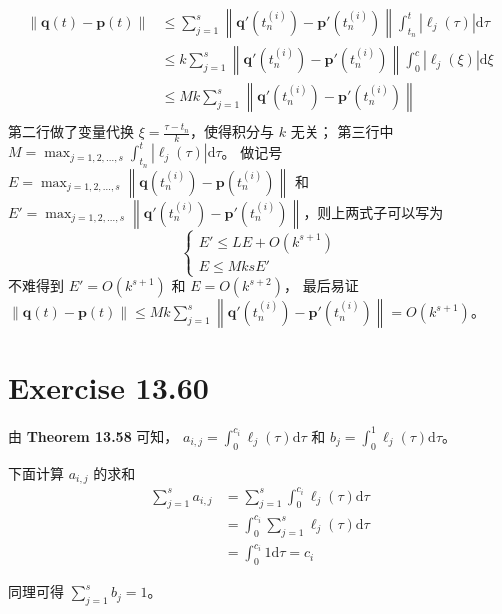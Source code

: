 \documentclass[a4paper]{article}
\begin{document}
\begin{itemize}
\begin{equation}
        \begin{aligned}
            \left\|\mathbf{q}(t) - \mathbf{p}(t)\right\|
            &\leq \sum_{j=1}^{s} \left\|
                \mathbf{q}'(t_n^{(i)}) - \mathbf{p}'(t_n^{(i)})
            \right\| \int_{t_n}^{t} |\ell_j(\tau)| \text{d}\tau\\
            &\leq k\sum_{j=1}^{s} \left\|
                \mathbf{q}'(t_n^{(i)}) - \mathbf{p}'(t_n^{(i)})
            \right\| \int_{0}^{c} |\ell_j(\xi)| \text{d}\xi\\
            &\leq Mk\sum_{j=1}^{s} \left\|
                \mathbf{q}'(t_n^{(i)}) - \mathbf{p}'(t_n^{(i)})
            \right\|\\
        \end{aligned}
    \end{equation}
    第二行做了变量代换 $\xi = \frac{\tau - t_n}{k}$，使得积分与 $k$ 无关；
    第三行中 $M = \displaystyle\max_{j=1,2,\ldots,s} \int_{t_n}^{t} |\ell_j(\tau)| \text{d}\tau$。
    做记号 $E = \displaystyle\max_{j=1,2,\ldots,s} \left\|
        \mathbf{q}(t_n^{(i)}) - \mathbf{p}(t_n^{(i)})
    \right\|$ 和 $E' = \displaystyle\max_{j=1,2,\ldots,s} \left\|
        \mathbf{q}'(t_n^{(i)}) - \mathbf{p}'(t_n^{(i)})
    \right\|$，则上两式子可以写为
    \begin{equation}
        \begin{cases}
            E' \leq L E + O(k^{s+1})\\
            E \leq Mks E'
        \end{cases}
    \end{equation}
    不难得到 $E' = O(k^{s+1})$ 和 $E = O(k^{s+2})$，
    最后易证 $\left\|\mathbf{q}(t) - \mathbf{p}(t)\right\| 
    \leq Mk\displaystyle\sum_{j=1}^{s} \left\|
        \mathbf{q}'(t_n^{(i)}) - \mathbf{p}'(t_n^{(i)})
    \right\| = O(k^{s+1})$。
\end{itemize}

\section*{Exercise 13.60}

\par 由 \textbf{Theorem 13.58} 可知，
$a_{i,j} = \displaystyle\int_{0}^{c_i}\ell_j(\tau) \text{d}\tau$
和 $b_j = \displaystyle\int_{0}^{1}\ell_j(\tau) \text{d}\tau$。
\par 下面计算 $a_{i,j}$ 的求和
\begin{equation}
    \begin{aligned}
        \sum_{j=1}^{s} a_{i,j} &= \sum_{j=1}^{s} \int_{0}^{c_i}\ell_j(\tau) \text{d}\tau\\
        &= \int_{0}^{c_i} \sum_{j=1}^{s} \ell_j(\tau) \text{d}\tau\\
        &= \int_{0}^{c_i} 1 \text{d}\tau = c_i
    \end{aligned}
\end{equation}
\par 同理可得 $\displaystyle\sum_{j=1}^{s} b_j = 1$。
\end{document}

